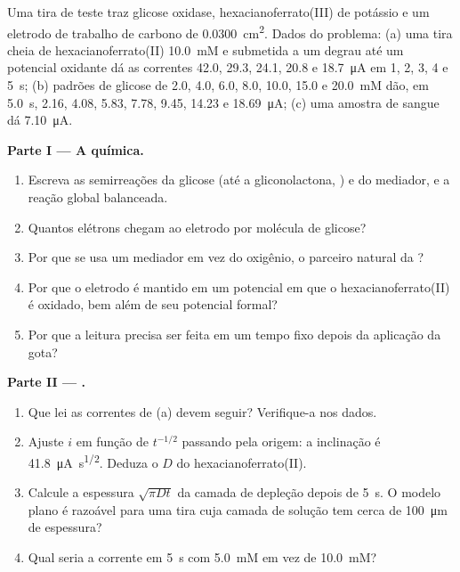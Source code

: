\begin{problem}
\label{pb:b3:electrode-kinetics:1}
Uma tira de teste traz glicose oxidase, hexacianoferrato(III) de potássio e um
eletrodo de trabalho de carbono de \qty{0.0300}{cm^2}. Dados do problema: (a) uma tira
cheia de hexacianoferrato(II) \qty{10.0}{mM} e submetida a um degrau até um potencial
oxidante dá as correntes 42.0, 29.3, 24.1, 20.8 e \qty{18.7}{\micro A} em 1, 2, 3, 4 e \qty{5}{s};
(b) padrões de glicose de 2.0, 4.0, 6.0, 8.0, 10.0, 15.0 e \qty{20.0}{mM} dão, em
\qty{5.0}{s}, 2.16, 4.08, 5.83, 7.78, 9.45, 14.23 e \qty{18.69}{\micro A}; (c) uma amostra de sangue dá
\qty{7.10}{\micro A}.

\medskip\noindent\textbf{Parte I --- A química.}
\begin{enumerate}
  \item Escreva as semirreações da glicose (até a gliconolactona, ) e do
        mediador, e a reação global balanceada.
  \item Quantos elétrons chegam ao eletrodo por molécula de glicose?
  \item Por que se usa um mediador em vez do oxigênio, o parceiro natural da
        ?
  \item Por que o eletrodo é mantido em um potencial em que o hexacianoferrato(II)
        é oxidado, bem além de seu potencial formal?
  \item Por que a leitura precisa ser feita em um tempo fixo depois da aplicação
        da gota?
\end{enumerate}

\medskip\noindent\textbf{Parte II --- .}
\begin{enumerate}[resume]
  \item Que lei as correntes de (a) devem seguir? Verifique-a nos dados.
  \item Ajuste $i$ em função de $t^{-1/2}$ passando pela origem: a inclinação é \qty{41.8}{\micro A.s^{1/2}}. Deduza
        o $D$ do hexacianoferrato(II).
  \item Calcule a espessura $\sqrt{\pi Dt}$ da camada de depleção depois de \qty{5}{s}. O
        modelo plano é razoável para uma tira cuja camada de solução tem cerca de
        \qty{100}{\micro m} de espessura?
  \item Qual seria a corrente em \qty{5}{s} com \qty{5.0}{mM} em vez de \qty{10.0}{mM}?
\end{enumerate}


\end{problem}
